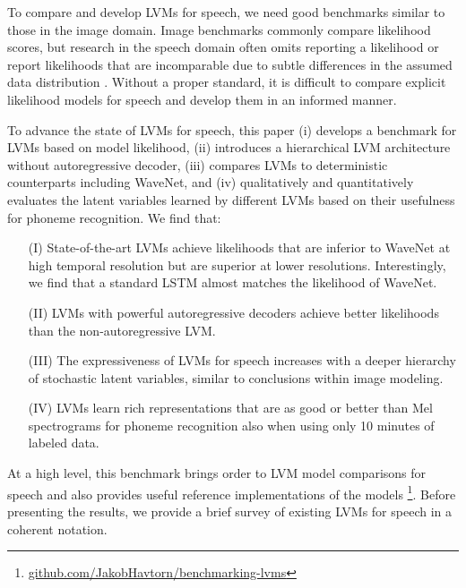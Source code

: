 {To compare and develop LVMs for speech, we need good benchmarks similar to those in the image domain. Image benchmarks commonly compare likelihood scores, but research in the speech domain often omits reporting a likelihood \cite{oord_wavenet_2016, hsu_unsupervised_2017, oord_neural_2018} or report likelihoods that are incomparable due to subtle differences in the assumed data distribution \cite{chung_recurrent_2015, fraccaro_sequential_2016, hsu_unsupervised_2017, aksan_stcn_2019}. Without a proper standard, it is difficult to compare explicit likelihood models for speech and develop them in an informed manner.

To advance the state of LVMs for speech, this paper (i) develops a benchmark for LVMs based on model likelihood, (ii) introduces a hierarchical LVM architecture without autoregressive decoder, (iii) compares LVMs to deterministic counterparts including WaveNet, and (iv) qualitatively and quantitatively evaluates the latent variables learned by different LVMs based on their usefulness for phoneme recognition. We find that:
\begin{itemize}[leftmargin=8mm]
    \setlength\itemsep{-0em}
    \item [(I)] State-of-the-art LVMs achieve likelihoods that are inferior to WaveNet at high temporal resolution but are superior at lower resolutions. Interestingly, we find that a standard LSTM \cite{hochreiter_long_1997} almost matches the likelihood of WaveNet.
    \item [(II)] LVMs with powerful autoregressive decoders achieve better likelihoods than the non-autoregressive LVM.
    \item[(III)] The expressiveness of LVMs for speech increases with a deeper hierarchy of stochastic latent variables, similar to conclusions within image modeling. %
    \item[(IV)] LVMs learn rich representations that are as good or better than Mel spectrograms for phoneme recognition also when using only 10 minutes of labeled data.
\end{itemize}
At a high level, this benchmark brings order to LVM model comparisons for speech and also provides useful reference implementations of the models
\footnote{\href{https://github.com/JakobHavtorn/benchmarking-lvms}{\url{github.com/JakobHavtorn/benchmarking-lvms}}}.
Before presenting the results, we provide a brief survey of existing LVMs for speech in a coherent notation. 


}
